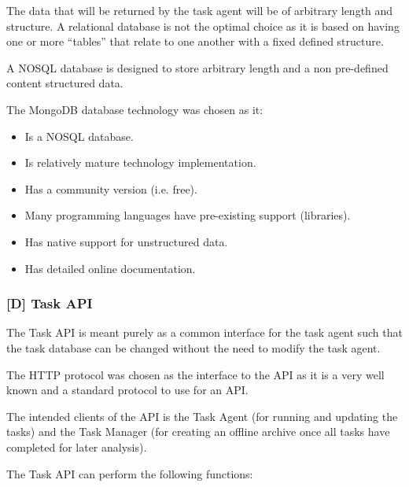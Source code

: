 \documentclass{mscreport}
\begin{document}
\vspace{0.3cm} \noindent
The data that will be returned by the task agent will be of arbitrary length and structure. A relational database is not the optimal choice as it is based on having one or more ``tables'' that relate to one another with a fixed defined structure.

\vspace{0.3cm} \noindent
A NOSQL database is designed to store arbitrary length and a non pre-defined content structured data.

\vspace{0.3cm} \noindent
The MongoDB database technology was chosen as it:

\begin{itemize}
	\setlength\itemsep{0.1em}
    \item Is a NOSQL database.
    \item Is relatively mature technology implementation.
    \item Has a community version (i.e. free).
    \item Many programming languages have pre-existing support (libraries).
    \item Has native support for unstructured data.
    \item Has detailed online documentation.
\end{itemize}

\subsubsection{[D] Task API}

The Task API is meant purely as a common interface for the task agent such that the task database can be changed without the need to modify the task agent.

\vspace{0.3cm} \noindent
The HTTP protocol was chosen as the interface to the API as it is a very well known and a standard protocol to use for an API.

\vspace{0.3cm} \noindent
The intended clients of the API is the Task Agent (for running and updating the tasks) and the Task Manager (for creating an offline archive once all tasks have completed for later analysis).

\vspace{0.3cm} \noindent
The Task API can perform the following functions:
\end{document}
